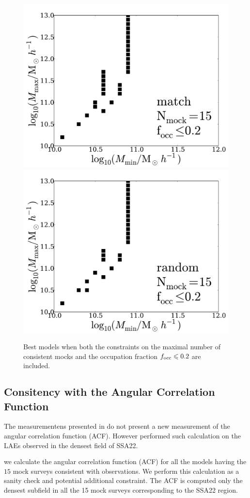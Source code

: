 \documentclass[usenatbib]{mn2e}
\begin{document}
\begin{figure}
\begin{center}
\includegraphics[width=0.46\linewidth,angle=0]{./plots/Fig5_match_mass_mock_and_f_occ.pdf}
\hspace{5mm}
\includegraphics[width=0.46\linewidth,angle=0]{./plots/Fig5_random_mass_mock_and_f_occ.pdf}
\end{center} 
\caption{Best models when both the constraints on the maximal number
  of  consistent mocks and the occupation  fraction $f_{\rm occ}\leq
  0.2$ are included.  \label{fig:restriction_mock_and_f_occ}}   
\end{figure}



\subsection{Consitency with the Angular Correlation Function}

The measurementens presented in \citep{Yamada2012} do not present a
new measurement of the angular correlation function (ACF). However
\citep{Hayashino2004} performed such calculation on the LAEs observed
in the densest field of SSA22.  

we calculate the angular correlation function
(ACF) for all the models having the $15$ mock surveys consistent with
observations. We perform this calculation as a sanity check and
potential additional constraint. The ACF is computed only the densest
subfield in all the 15 mock surveys corresponding to the SSA22
region. 
\end{document}

